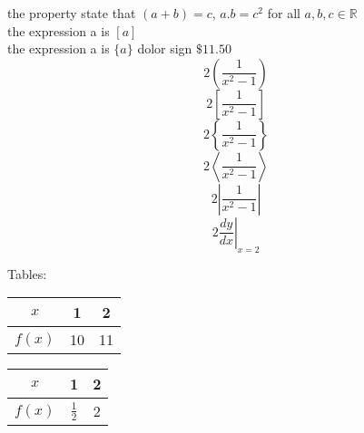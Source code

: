 \documentclass[12pt]{article}
\begin{document}
the property state that $(a+b)=c$, $a.b=c^2$ for all $a,b,c \in \mathbb{R}$ \\[6pt]
the expression a is $[a]$ \\[6pt]
the expression a is $\{a\}$
dolor sign $\$11.50$ \\[6pt]
$$2\left(\frac{1}{x^2-1} \right)$$
$$2\left[\frac{1}{x^2-1} \right]$$
$$2\left\{\frac{1}{x^2-1} \right\}$$
$$2\left \langle \frac{1}{x^2-1} \right \rangle$$
$$2\left|\frac{1}{x^2-1} \right|$$
$$2\left.\frac{dy}{dx}\right|_{x=2}$$

Tables:\\[10pt]
\begin{tabular}{|c||c|c|}
\hline
$x$ &1 &2 \\ \hline
$f(x)$ &10 &11\\ \hline
\end{tabular}

\vspace{1cm}

\begin{table}[H]
\begin{tabular}{|c||c|c|}
\hline
$x$ &1 &2 \\ \hline
$f(x)$ & $\frac{1}{2}$ &2 \\ \hline
\end{tabular}
\end{table}
\end{document}
